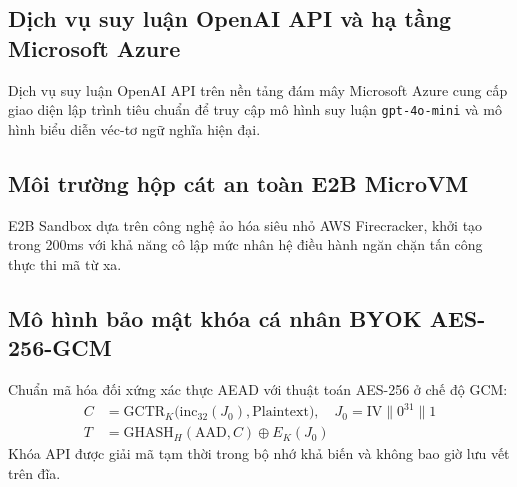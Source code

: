 
\subsection{Dịch vụ suy luận OpenAI API và hạ tầng Microsoft Azure}
\label{subsec:azure_openai_compat}
Dịch vụ suy luận OpenAI API trên nền tảng đám mây Microsoft Azure cung cấp giao diện lập trình tiêu chuẩn để truy cập mô hình suy luận \texttt{gpt-4o-mini} và mô hình biểu diễn véc-tơ ngữ nghĩa hiện đại.

\subsection{Môi trường hộp cát an toàn E2B MicroVM}
\label{subsec:e2b_sandbox_compat}
E2B Sandbox dựa trên công nghệ ảo hóa siêu nhỏ AWS Firecracker, khởi tạo trong 200ms với khả năng cô lập mức nhân hệ điều hành ngăn chặn tấn công thực thi mã từ xa.

\subsection{Mô hình bảo mật khóa cá nhân BYOK AES-256-GCM}
\label{subsec:byok_security_compat}
Chuẩn mã hóa đối xứng xác thực AEAD với thuật toán AES-256 ở chế độ GCM:
\begin{equation}
\label{eq:aes_gcm_compat}
\begin{aligned}
C &= \text{GCTR}_K\bigl(\text{inc}_{32}(J_0), \text{Plaintext}\bigr), \quad J_0 = \text{IV} \parallel 0^{31} \parallel 1 \\
T &= \text{GHASH}_H(\text{AAD}, C) \oplus E_K(J_0)
\end{aligned}
\end{equation}
Khóa API được giải mã tạm thời trong bộ nhớ khả biến và không bao giờ lưu vết trên đĩa.
